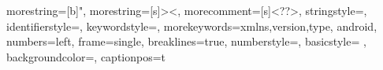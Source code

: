 \usepackage{listings}

\usepackage{color}


{
    morestring=[b]",
    morestring=[s]{>}{<},
    morecomment=[s]{<?}{?>},
    stringstyle=\color{darkgreen},
    identifierstyle=\color{darkblue},
    keywordstyle=\color{cyan},
    morekeywords={xmlns,version,type, android},%
    numbers=left,                               %
    frame=single,                               %
    breaklines=true,                            %
    numberstyle=\small,                         %
    basicstyle={\small} ,                       %
    backgroundcolor=\color{Gray!3},               %
    captionpos=t                               %
}